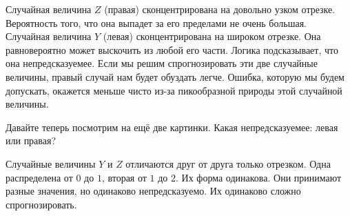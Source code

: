 \documentclass[12pt, a4paper, oneside]{article}
\begin{document}
Случайная величина $Z$ (правая) сконцентрирована на довольно узком отрезке. Вероятность того, что она выпадет за его пределами не очень большая. Случайная величина $Y$ (левая) сконцентрирована на широком отрезке. Она равновероятно может выскочить из любой его части. Логика подсказывает, что она непредсказуемее. Если мы решим спрогнозировать эти две случайные величины, правый случай нам будет обуздать легче. Ошибка, которую мы будем допускать, окажется меньше чисто из-за пикообразной природы этой случайной величины. 

Давайте теперь посмотрим на ещё две картинки. Какая непредсказуемее: левая или правая? 

\begin{figure}[H]
	\begin{minipage}[H]{0.49\linewidth}
	\end{minipage}
	\hfill
	\begin{minipage}[H]{0.49\linewidth}
	\end{minipage}
\end{figure} 

Случайные величины $Y$ и $Z$ отличаются друг от друга только отрезком. Одна распределена от $0$ до $1$, вторая от $1$ до $2$. Их форма одинакова. Они принимают разные значения, но одинаково непредсказуемо. Их одинаково сложно спрогнозировать.
\end{document}
